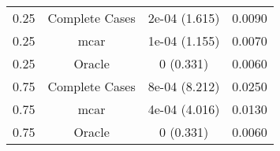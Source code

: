 \begin{table}[ht]
\centering
\begin{tabular}{cccc}
  \hline
  \hline
0.25 & Complete Cases & 2e-04 (1.615) & 0.0090 \\ 
  0.25 & mcar & 1e-04 (1.155) & 0.0070 \\ 
  0.25 & Oracle & 0 (0.331) & 0.0060 \\ 
  0.75 & Complete Cases & 8e-04 (8.212) & 0.0250 \\ 
  0.75 & mcar & 4e-04 (4.016) & 0.0130 \\ 
  0.75 & Oracle & 0 (0.331) & 0.0060 \\ 
   \hline
\end{tabular}
\end{table}
